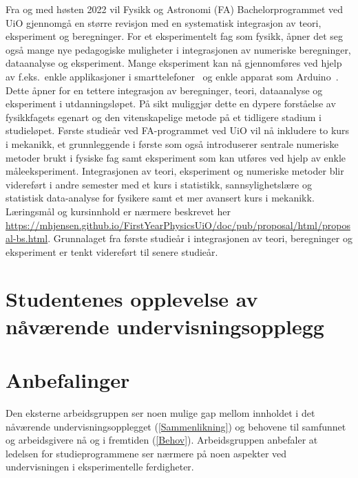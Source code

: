 \documentclass{article}
\begin{document}
Fra og med høsten 2022 vil Fysikk og Astronomi (FA) Bachelorprogrammet ved UiO gjennomgå en større revisjon med 
en systematisk integrasjon av teori, eksperiment og beregninger.
For et eksperimentelt fag som fysikk, åpner det seg også mange nye pedagogiske muligheter i integrasjonen av numeriske beregninger, dataanalyse og eksperiment. Mange eksperiment kan nå gjennomføres ved hjelp av f.eks.\ enkle applikasjoner i smarttelefoner~\cite{phyphox} og enkle apparat som Arduino~\cite{arduino}. Dette åpner for en tettere integrasjon av beregninger, teori, dataanalyse og eksperiment i utdanningsløpet. På sikt muliggjør dette en dypere forståelse av fysikkfagets egenart og den vitenskapelige metode på et tidligere stadium i studieløpet.  Første studieår ved FA-programmet ved UiO vil nå inkludere to kurs i mekanikk, et grunnleggende i første som også introduserer sentrale numeriske metoder brukt i fysiske fag samt eksperiment som kan utføres ved hjelp av enkle måleeksperiment. Integrasjonen av teori, eksperiment og numeriske metoder blir videreført i andre semester med et kurs i statistikk, sannsylighetslære og statistisk data-analyse for fysikere samt et mer avansert kurs i mekanikk.
Læringsmål og kursinnhold er nærmere beskrevet her \url{https://mhjensen.github.io/FirstYearPhysicsUiO/doc/pub/proposal/html/proposal-bs.html}.
Grunnalaget fra første studieår i integrasjonen av teori, beregninger og eksperiment er tenkt videreført til senere studieår. 



\section{Studentenes opplevelse av nåværende undervisningsopplegg}
\section{Anbefalinger}

Den eksterne arbeidsgruppen ser noen mulige gap mellom innholdet i det nåværende undervisningsopplegget (\cref{Sammenlikning}) og behovene til samfunnet og arbeidsgivere nå og i fremtiden (\cref{Behov}). Arbeidsgruppen anbefaler at ledelsen for studieprogrammene ser nærmere på noen aspekter ved undervisningen i eksperimentelle ferdigheter.
\end{document}

